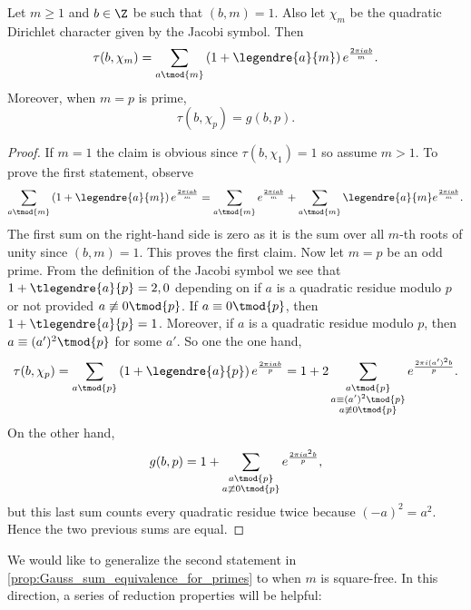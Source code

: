         \begin{proposition}\label{prop:Gauss_sum_equivalence_for_primes}
          Let $m \ge 1$ and $b \in \Z$ be such that $(b,m) = 1$. Also let $\chi_{m}$ be the quadratic Dirichlet character given by the Jacobi symbol. Then
          \[
            \tau(b,\chi_{m}) = \sum_{a \tmod{m}}\left(1+\legendre{a}{m}\right)e^{\frac{2\pi iab}{m}}.
          \]
          Moreover, when $m = p$ is prime,
          \[
            \tau(b,\chi_{p}) = g(b,p).
          \]
        \end{proposition}
        \begin{proof}
          If $m = 1$ the claim is obvious since $\tau(b,\chi_{1}) = 1$ so assume $m > 1$. To prove the first statement, observe
          \[
            \sum_{a \tmod{m}}\left(1+\legendre{a}{m}\right)e^{\frac{2\pi iab}{m}} = \sum_{a \tmod{m}}e^{\frac{2\pi iab}{m}}+\sum_{a \tmod{m}}\legendre{a}{m}e^{\frac{2\pi iab}{m}}.
          \]
          The first sum on the right-hand side is zero as it is the sum over all $m$-th roots of unity since $(b,m) = 1$. This proves the first claim. Now let $m = p$ be an odd prime. From the definition of the Jacobi symbol we see that $1+\tlegendre{a}{p} = 2,0$ depending on if $a$ is a quadratic residue modulo $p$ or not provided $a \not\equiv 0 \tmod{p}$. If $a \equiv 0 \tmod{p}$, then $1+\tlegendre{a}{p} = 1$. Moreover, if $a$ is a quadratic residue modulo $p$, then $a \equiv (a')^{2} \tmod{p}$ for some $a'$. So one the one hand,
          \[
            \tau(b,\chi_{p}) = \sum_{a \tmod{p}}\left(1+\legendre{a}{p}\right)e^{\frac{2\pi iab}{p}} = 1+2\sum_{\substack{a \tmod{p} \\ a \equiv (a')^{2} \tmod{p} \\ a \not\equiv 0 \tmod{p}}}e^{\frac{2\pi i(a')^{2}b}{p}}.
          \]
          On the other hand,
          \[
            g(b,p) = 1+\sum_{\substack{a \tmod{p} \\ a \not\equiv 0 \tmod{p}}}e^{\frac{2\pi ia^{2}b}{p}},
          \]
          but this last sum counts every quadratic residue twice because $(-a)^{2} = a^{2}$. Hence the two previous sums are equal.
        \end{proof}

        We would like to generalize the second statement in \cref{prop:Gauss_sum_equivalence_for_primes} to when $m$ is square-free. In this direction, a series of reduction properties will be helpful:

